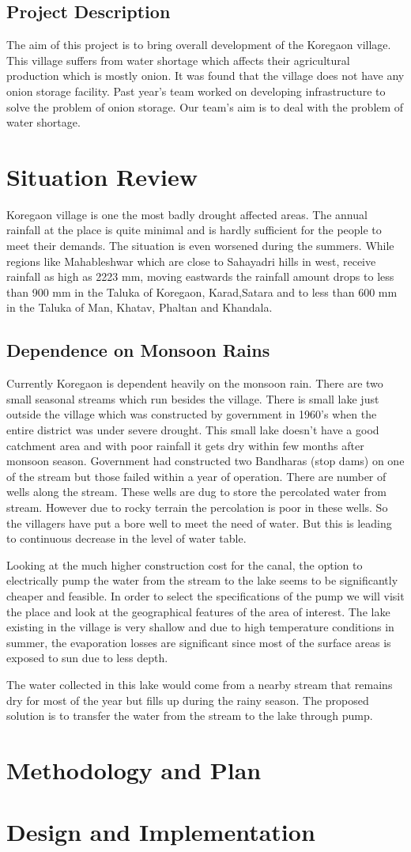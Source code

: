 \documentclass{article}
\begin{document}
\subsection{Project Description}
The aim of this project is to bring overall development of the Koregaon village. This village suffers from
water shortage which affects their agricultural production which is mostly onion. It was found that the
village does not have any onion storage facility. Past year's team worked on developing infrastructure to solve the problem of onion storage. Our team's aim is to deal with the problem of water shortage.
\section{Situation Review}
Koregaon village is one the most badly drought affected areas. The annual rainfall at the place is quite minimal and is hardly sufficient for the people to meet their demands. The situation is even worsened during the summers. While regions like Mahableshwar which are close to Sahayadri hills in west, receive rainfall as high as 2223 mm, moving eastwards the rainfall amount drops to less than 900 mm in the Taluka of Koregaon, Karad,Satara and to less than 600 mm in the Taluka of Man, Khatav, Phaltan and Khandala.
\subsection{Dependence on Monsoon Rains}
Currently Koregaon is dependent heavily on the monsoon rain. There are two small seasonal streams which run besides the village. There is small lake just outside the village which was constructed by government in 1960’s when the entire district was under severe drought. This small lake doesn’t have a good catchment area and with poor rainfall it gets dry within few months after monsoon season. Government had constructed two Bandharas (stop dams) on one of the stream but those failed within a year of operation. There are number of wells along the stream. These wells are dug to store the percolated water from stream. However due to rocky terrain the percolation is poor in these wells. So the villagers have put a bore well to meet the need of water. But this is leading to continuous decrease in the level of water table.

Looking at the much higher construction cost for the canal, the option to electrically pump the water from the stream to the lake seems to be significantly cheaper and feasible. In order to select the specifications of the pump we will visit the place and look at the geographical features of the area of interest. The lake existing in the village is very shallow and due to high temperature conditions in summer, the evaporation losses are significant since most of the surface areas is exposed to sun due to less depth.

The water collected in this lake would come from a nearby stream that remains dry for most of the year but fills up during the rainy season. The proposed solution is to transfer the water from the stream to the lake through pump.

\section{Methodology and Plan}

\section{Design and Implementation}
\end{document}

